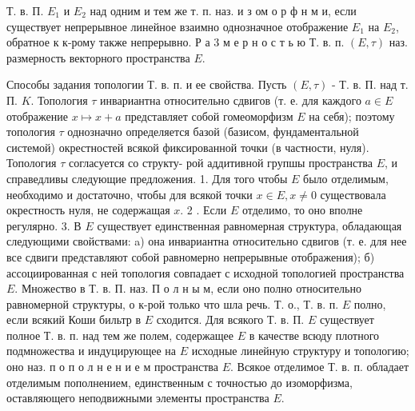 \documentclass[10pt]{article}
\begin{document}
Т. в. П. $E_{1}$ и $E_{2}$ над одним и тем же т. п. наз. и з ом о р ф н м и, если существует непрерывное линейное взаимно однозначное отображение $E_{1}$ на $E_{2}$, обратное к к-рому также непрерывно. Р а 3 м е р н о с т ь ю Т. в. п. $(E, \tau)$ наз. размерность векторного пространства $E$.



Способы задания топологии Т. в. п. и ее свойства. Пусть $(E, \tau)$ - Т. в. П. над т. П. $K$. Топология $\tau$ инвариантна относительно сдвигов (т. е. для каждого $a \in E$ отображение $x \mapsto x+a$ представляет собой гомеоморфизм $E$ на себя); поэтому топология $\tau$ однозначно определяется базой (базисом, фундаментальной системой) окрестностей всякой фиксированной точки (в частности, нуля). Топология $\tau$ согласуется со структу- рой аддитивной групшы пространства $E$, и справедливы следующие предложения. 1. Для того чтобы $E$ было отделимым, необходимо и достаточно, чтобы для всякой точки $x \in E, x \neq 0$ существовала окрестность нуля, не содержащая $x$. 2 . Если $E$ отделимо, то оно вполне регулярно. 3. В $E$ существует единственная равномерная структура, обладающая следующими свойствами: a) она инвариантна относительно сдвигов (т. е. для нее все сдвиги представляют собой равномерно непрерывные отображения); б) ассоциированная с неӥ топология совпадает с исходной топологией пространства $E$. Множество в Т. в. П. наз. П о л н ы м, если оно полно относительно равномерной структуры, о к-рой только что шла речь. Т. о., Т. в. п. $E$ полно, если всякий Коши бильтр в $E$ сходится. Для всякого Т. в. П. $E$ существует полное Т. в. п. над тем же полем, содержащее $E$ в качестве всюду плотного подмножества и индуцирующее на $E$ исходные линейную структуру и топологию; оно наз. п о п о л н е н и е м пространства $E$. Всякое отделимое Т. в. п. обладает отделимым пополнением, единственным с точностью до изоморфизма, оставляющего неподвижными элементы пространства $E$.
\end{document}
